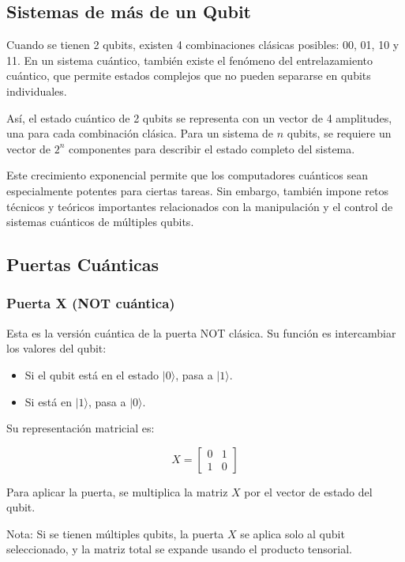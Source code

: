\documentclass{article}
\begin{document}
\subsection*{Sistemas de más de un Qubit}

Cuando se tienen 2 qubits, existen 4 combinaciones clásicas posibles: 00, 01, 10 y 11. En un sistema cuántico, también existe el fenómeno del entrelazamiento cuántico, que permite estados complejos que no pueden separarse en qubits individuales.

Así, el estado cuántico de 2 qubits se representa con un vector de 4 amplitudes, una para cada combinación clásica. Para un sistema de $n$ qubits, se requiere un vector de $2^n$ componentes para describir el estado completo del sistema.

Este crecimiento exponencial permite que los computadores cuánticos sean especialmente potentes para ciertas tareas. Sin embargo, también impone retos técnicos y teóricos importantes relacionados con la manipulación y el control de sistemas cuánticos de múltiples qubits.

\subsection*{Puertas Cuánticas}

\subsubsection*{Puerta X (NOT cuántica)}

Esta es la versión cuántica de la puerta NOT clásica. Su función es intercambiar los valores del qubit:

\begin{itemize}
    \item Si el qubit está en el estado $\vert 0 \rangle$, pasa a $\vert 1 \rangle$.
    \item Si está en $\vert 1 \rangle$, pasa a $\vert 0 \rangle$.
\end{itemize}

Su representación matricial es:

\[
X = \begin{bmatrix} 0 & 1 \\ 1 & 0 \end{bmatrix}
\]

Para aplicar la puerta, se multiplica la matriz $X$ por el vector de estado del qubit.

Nota: Si se tienen múltiples qubits, la puerta $X$ se aplica solo al qubit seleccionado, y la matriz total se expande usando el producto tensorial.
\end{document}
